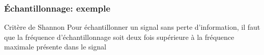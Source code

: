 \documentclass{beamer}
\begin{document}
\begin{frame} 
\frametitle{\'Echantillonnage: exemple}
\begin{block}{Critère de Shannon}
Pour échantillonner un signal sans perte d'information, il faut que la fréquence d'échantillonnage soit deux fois supérieure à la fréquence maximale présente dans le signal
\end{block}


\end{frame}
\end{document}
